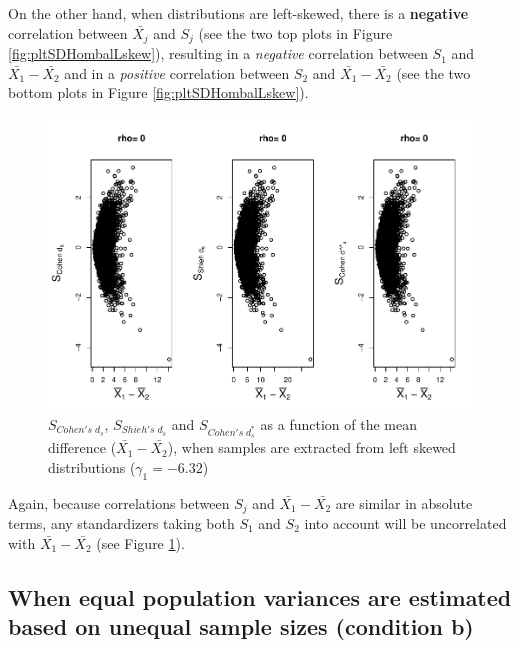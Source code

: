 \documentclass[
  english,
  man,mask]{apa6}
\begin{document}
On the other hand, when distributions are left-skewed, there is a \textbf{negative} correlation between \(\bar{X_j}\) and \(S_j\) (see the two top plots in Figure \ref{fig:pltSDHombalLskew}), resulting in a \emph{negative} correlation between \(S_1\) and \(\bar{X_1}-\bar{X_2}\) and in a \emph{positive} correlation between \(S_2\) and \(\bar{X_1}-\bar{X_2}\) (see the two bottom plots in Figure \ref{fig:pltSDHombalLskew}).

\begin{figure}
\centering
\includegraphics{Correlation_files/figure-latex/pltStdzrHombalLskew-1.pdf}
\caption{\label{fig:pltStdzrHombalLskew}\(S_{Cohen's \; d_s}\), \(S_{Shieh's \; d_s}\) and \(S_{Cohen's \; d^*_s}\) as a function of the mean difference (\(\bar{X_1}-\bar{X_2}\)), when samples are extracted from left skewed distributions (\(\gamma_1 = -6.32\))}
\end{figure}

Again, because correlations between \(S_j\) and \(\bar{X_1}-\bar{X_2}\) are similar in absolute terms, any standardizers taking both \(S_1\) and \(S_2\) into account will be uncorrelated with \(\bar{X_1}-\bar{X_2}\) (see Figure \ref{fig:pltStdzrHombalLskew}).

\hypertarget{when-equal-population-variances-are-estimated-based-on-unequal-sample-sizes-condition-b}{%
\subsection{When equal population variances are estimated based on unequal sample sizes (condition b)}\label{when-equal-population-variances-are-estimated-based-on-unequal-sample-sizes-condition-b}}
\end{document}
